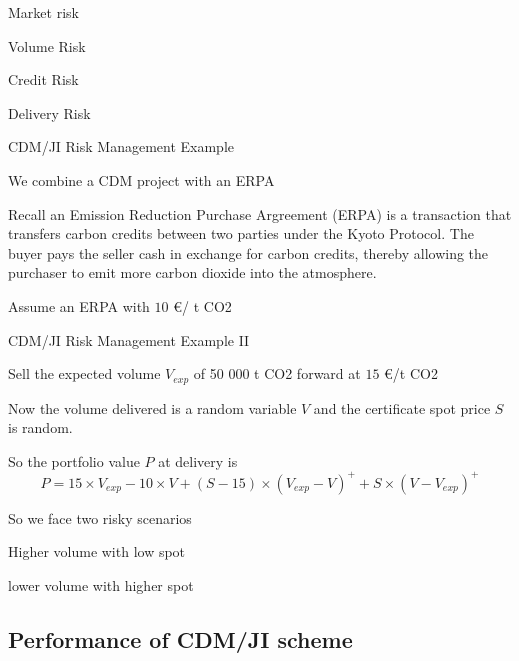 	Market risk


	Volume Risk


	Credit Risk


	Delivery Risk





{CDM/JI Risk Management Example}






	We combine a CDM project with an ERPA


	Recall an Emission Reduction Purchase Argreement (ERPA) is a  transaction that transfers carbon credits between two parties under the Kyoto Protocol. The buyer pays the seller cash in exchange for carbon credits, thereby allowing the purchaser to emit more carbon dioxide into the atmosphere.


	Assume an ERPA with $10$ \euro/ t CO2





{CDM/JI Risk Management Example II}






	Sell the expected volume $V_{exp}$ of 50 000 t CO2 forward at $15$ \euro /t CO2


	Now the volume delivered is a random variable $V$ and the certificate spot price $S$ is random.


	So the portfolio value $P$ at delivery is
\begin{equation}\nonumber
P = 15 \times V_{exp} - 10 \times V + (S-15) \times (V_{exp}-V)^+ + S \times (V-V_{exp})^+
\end{equation}


	So we face two risky scenarios






	Higher volume with low spot


	lower volume with higher spot









\subsection{Performance of CDM/JI scheme}

